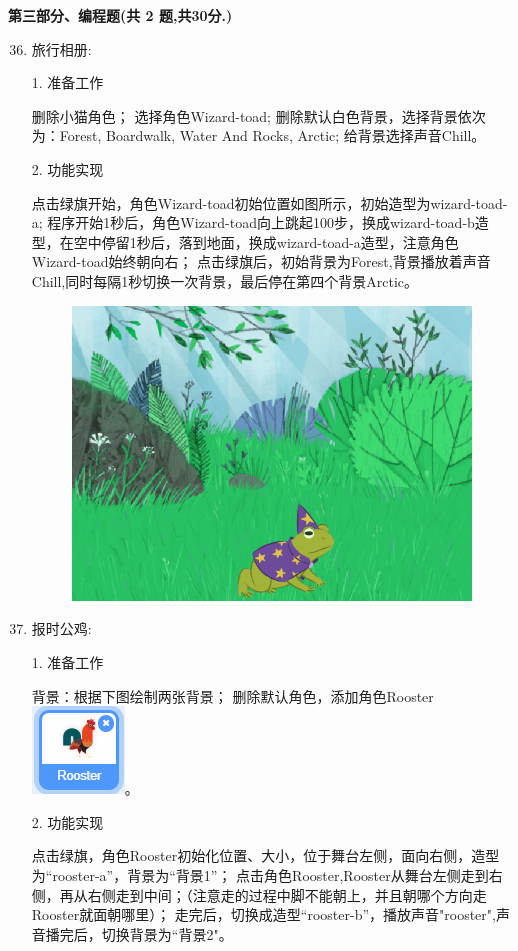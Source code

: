 \documentclass[10pt, a4paper]{article}
\begin{document}
    \newpage
    {\noindent \textbf{第三部分、编程题(共 2 题,共30分.)}}
    \begin{enumerate}
        \setcounter{enumi}{35}
        
        \item 旅行相册:
        
        1. 准备工作
        \begin{tasks}[label = (\arabic*)]
            \task 删除小猫角色；
            \task 选择角色Wizard-toad;
            \task 删除默认白色背景，选择背景依次为：Forest, Boardwalk, Water And Rocks, Arctic;
            \task 给背景选择声音Chill。
        \end{tasks}
        2. 功能实现
        \begin{tasks}[label = (\arabic*)]
            \task 点击绿旗开始，角色Wizard-toad初始位置如图所示，初始造型为wizard-toad-a;
            \task 程序开始1秒后，角色Wizard-toad向上跳起100步，换成wizard-toad-b造型，在空中停留1秒后，落到地面，换成wizard-toad-a造型，注意角色
            Wizard-toad始终朝向右；
            \task 点击绿旗后，初始背景为Forest,背景播放着声音Chill,同时每隔1秒切换一次背景，最后停在第四个背景Arctic。
        \end{tasks}
        \begin{figure}[htbp]
            \centering
            \includegraphics[width=.26\textwidth]{36.png}
        \end{figure}

        \item 报时公鸡:
        
        1. 准备工作
        \begin{tasks}[label = (\arabic*)]
            \task 背景：根据下图绘制两张背景；
            \task 删除默认角色，添加角色Rooster\includegraphics[width=.05\textwidth]{37-2.png}。
        \end{tasks}
        2. 功能实现
        \begin{tasks}[label = (\arabic*)]
            \task 点击绿旗，角色Rooster初始化位置、大小，位于舞台左侧，面向右侧，造型为“rooster-a”，背景为“背景1”；
            \task 点击角色Rooster,Rooster从舞台左侧走到右侧，再从右侧走到中间；（注意走的过程中脚不能朝上，并且朝哪个方向走Rooster就面朝哪里）；
            \task 走完后，切换成造型“rooster-b”，播放声音"rooster",声音播完后，切换背景为“背景2"。
        \end{tasks}


\end{enumerate}
\end{document}
